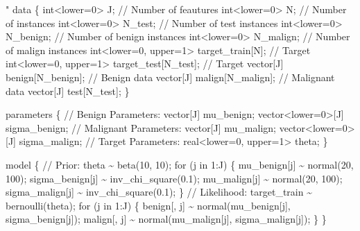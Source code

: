 \documentclass[
]{article}
\newenvironment{Shaded}{\begin{snugshade}}{\end{snugshade}}
\newcommand{\StringTok}[1]{\textcolor[rgb]{0.31,0.60,0.02}{#1}}
\begin{document}
\begin{Shaded}
\begin{Highlighting}[]
\StringTok{"}
\StringTok{data \{}
\StringTok{  int\textless{}lower=0\textgreater{} J;                        // Number of feautures}
\StringTok{  int\textless{}lower=0\textgreater{} N;                        // Number of instances}
\StringTok{  int\textless{}lower=0\textgreater{} N\_test;                        // Number of test instances}
\StringTok{  int\textless{}lower=0\textgreater{} N\_benign;                 // Number of benign instances}
\StringTok{  int\textless{}lower=0\textgreater{} N\_malign;                 // Number of malign instances}
\StringTok{  int\textless{}lower=0, upper=1\textgreater{} target\_train[N];        // Target}
\StringTok{  int\textless{}lower=0, upper=1\textgreater{} target\_test[N\_test];        // Target}
\StringTok{  vector[J] benign[N\_benign];            // Benign data}
\StringTok{  vector[J] malign[N\_malign];            // Malignant data}
\StringTok{  vector[J] test[N\_test];}
\StringTok{  }
\StringTok{\}}

\StringTok{parameters \{}
\StringTok{  // Benign Parameters:}
\StringTok{  vector[J] mu\_benign;}
\StringTok{  vector\textless{}lower=0\textgreater{}[J] sigma\_benign;}
\StringTok{  // Malignant Parameters:}
\StringTok{  vector[J] mu\_malign;}
\StringTok{  vector\textless{}lower=0\textgreater{}[J] sigma\_malign;}
\StringTok{  // Target Parameters:}
\StringTok{  real\textless{}lower=0, upper=1\textgreater{} theta;}
\StringTok{\}}

\StringTok{model \{}
\StringTok{  // Prior:}
\StringTok{  theta \textasciitilde{} beta(10, 10);}
\StringTok{  }
\StringTok{  for (j in 1:J) \{}
\StringTok{    mu\_benign[j] \textasciitilde{} normal(20, 100);}
\StringTok{    sigma\_benign[j] \textasciitilde{} inv\_chi\_square(0.1);}
\StringTok{    mu\_malign[j] \textasciitilde{} normal(20, 100);}
\StringTok{    sigma\_malign[j] \textasciitilde{} inv\_chi\_square(0.1);}
\StringTok{  \}}
\StringTok{  }
\StringTok{  // Likelihood:}
\StringTok{  target\_train \textasciitilde{} bernoulli(theta);}
\StringTok{  }
\StringTok{  for (j in 1:J) \{}
\StringTok{    benign[, j] \textasciitilde{} normal(mu\_benign[j], sigma\_benign[j]);}
\StringTok{    malign[, j] \textasciitilde{} normal(mu\_malign[j], sigma\_malign[j]);}
\StringTok{  \}}
\StringTok{\}}


\end{Highlighting}
\end{Shaded}
\end{document}
